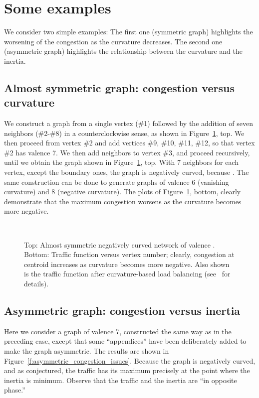 \documentclass{article}
\begin{document}
\noindent 
\section{Some examples}
\label{s:examples}

We consider two simple examples: 
The first one (symmetric graph) highlights the worsening of the congestion as the curvature decreases. 
The second one (asymmetric graph) highlights the relationship between the curvature and the inertia. 

\subsection{Almost symmetric graph: congestion versus curvature}

We construct a graph from a single vertex (\#1)  
followed by the addition of seven neighbors (\#2-\#8) in a counterclockwise sense, 
as shown in Figure~\ref{f:congestion_versus_degree}, top. 
We then proceed from vertex \#2 and add vertices \#9, \#10, \#11, \#12, 
so that vertex \#2 has valence 7. We then add neighbors to vertex \#3, 
and proceed recursively, 
until we obtain the graph shown in Figure~\ref{f:congestion_versus_degree}, top. 
With 7 neighbors for each vertex, except the boundary ones, the graph is negatively curved, 
because .  
The same construction can be done to generate graphs of valence 6 (vanishing curvature) 
and 8 (negative curvature). 
The plots of Figure~\ref{f:congestion_versus_degree}, bottom, clearly demonstrate 
that the maximum congestion worsens as the curvature becomes more negative. 

\begin{figure}[t]
\centering
\mbox{
} 
\caption{Top: Almost symmetric negatively curved network of valence . 
Bottom: Traffic function  versus vertex number; 
clearly, congestion at centroid increases as curvature becomes more negative. 
Also shown is the traffic function after curvature-based load balancing 
(see~\cite{mingjithesis} for details).
}
\label{f:congestion_versus_degree}
\end{figure}


\subsection{Asymmetric graph: congestion versus inertia}

Here we consider a graph of valence 7, constructed the same way as in the preceding case, 
except that some ``appendices'' have been deliberately added to make the graph asymmetric. 
The results are shown in Figure~\ref{f:asymmetric_congestion_issues}. 
Because the graph is negatively curved, and as conjectured, the traffic has its maximum  
precisely at the point where the inertia is minimum. 
Observe that the traffic and the inertia are ``in opposite phase.'' 
\end{document}
